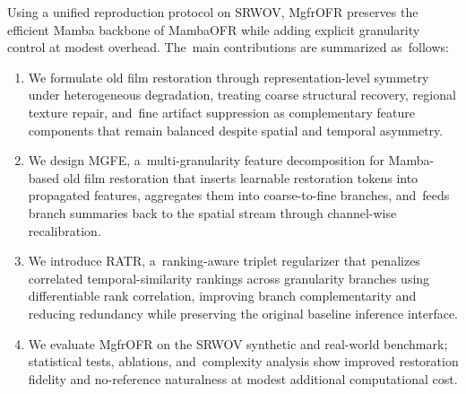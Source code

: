 \documentclass[symmetry,article,accept,pdftex,moreauthors]{Definitions/mdpi}
\begin{document}
Using a unified reproduction protocol on SRWOV, MgfrOFR preserves the efficient Mamba backbone of MambaOFR while adding explicit granularity control at modest overhead. The~main contributions are summarized as~follows:
\begin{enumerate}[nosep]
    \item We formulate old film restoration through representation-level symmetry under heterogeneous degradation, treating coarse structural recovery, regional texture repair, and~fine artifact suppression as complementary feature components that remain balanced despite spatial and temporal asymmetry.
    \item We design MGFE, a~multi-granularity feature decomposition for Mamba-based old film restoration that inserts learnable restoration tokens into propagated features, aggregates them into coarse-to-fine branches, and~feeds branch summaries back to the spatial stream through channel-wise recalibration.
    \item We introduce RATR, a~ranking-aware triplet regularizer that penalizes correlated temporal-similarity rankings across granularity branches using differentiable rank correlation, improving branch complementarity and reducing redundancy while preserving the original baseline inference interface.
    \item We evaluate MgfrOFR on the SRWOV synthetic and real-world benchmark; statistical tests, ablations, and~complexity analysis show improved restoration fidelity and no-reference \mbox{naturalness} at modest additional computational cost.
\end{enumerate}

\vspace{4pt}
\end{document}
